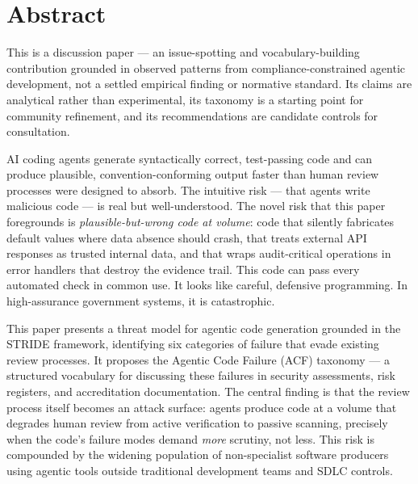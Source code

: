 \documentclass[a4paper,11pt]{report}
\begin{document}
\setcounter{page}{1}
\tableofcontents
\clearpage


\hypertarget{abstract}{%
\section{Abstract}\label{abstract}}

This is a discussion paper --- an issue-spotting and vocabulary-building
contribution grounded in observed patterns from compliance-constrained
agentic development, not a settled empirical finding or normative
standard. Its claims are analytical rather than experimental, its
taxonomy is a starting point for community refinement, and its
recommendations are candidate controls for consultation.

AI coding agents generate syntactically correct, test-passing code and
can produce plausible, convention-conforming output faster than human
review processes were designed to absorb. The intuitive risk --- that
agents write malicious code --- is real but well-understood. The novel
risk that this paper foregrounds is \emph{plausible-but-wrong code at
volume}: code that silently fabricates default values where data absence
should crash, that treats external API responses as trusted internal
data, and that wraps audit-critical operations in error handlers that
destroy the evidence trail. This code can pass every automated check in
common use. It looks like careful, defensive programming. In
high-assurance government systems, it is catastrophic.

This paper presents a threat model for agentic code generation grounded
in the STRIDE framework, identifying six categories of failure that
evade existing review processes. It proposes the Agentic Code Failure
(ACF) taxonomy --- a structured vocabulary for discussing these failures
in security assessments, risk registers, and accreditation
documentation. The central finding is that the review process itself
becomes an attack surface: agents produce code at a volume that degrades
human review from active verification to passive scanning, precisely
when the code's failure modes demand \emph{more} scrutiny, not less.
This risk is compounded by the widening population of non-specialist
software producers using agentic tools outside traditional development
teams and SDLC controls.
\end{document}
